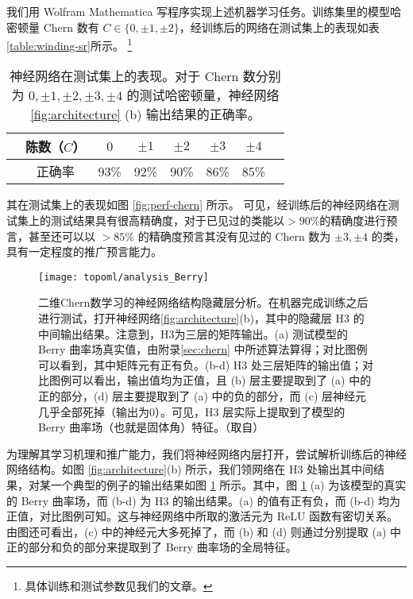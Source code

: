 我们用 Wolfram Mathematica 写程序实现上述机器学习任务。训练集里的模型哈密顿量 Chern 数有 $C\in\{0, \pm1, \pm2\}$，经训练后的网络在测试集上的表现如表\ref{table:winding-sr}所示。
\footnote{具体训练和测试参数见我们的文章。}

\begin{table}[t]
\centering
\caption{神经网络在测试集上的表现。对于 Chern 数分别为 $0, \pm1, \pm2, \pm3, \pm4$ 的测试哈密顿量，神经网络 \ref{fig:architecture} (b) 输出结果的正确率。}
\label{table:chern-sr}
\begin{tabular}{*{8}c}
\hline\hline
& 陈数（$C$） & $0$ & $\pm1$ & $\pm2$ & $\pm3$ & $\pm4$ & \\ \hline
& 正确率 & 93\% & 92\% & 90\% & 86\% & 85\% & \\
\hline\hline
\end{tabular}
\end{table}

其在测试集上的表现如图 \ref{fig:perf-chern} 所示。
可见，经训练后的神经网络在测试集上的测试结果具有很高精确度，对于已见过的类能以$>90\%$的精确度进行预言，甚至还可以以 $>85\%$ 的精确度预言其没有见过的 Chern 数为 $\pm3,\pm4$ 的类，具有一定程度的推广预言能力。


\begin{figure}[!htb]
\centering
\texttt{[image: topoml/analysis\_Berry]}
\caption{二维Chern数学习的神经网络结构隐藏层分析。在机器完成训练之后进行测试，打开神经网络\ref{fig:architecture}(b)，其中的隐藏层 H3 的中间输出结果。注意到，H3为三层的矩阵输出。(a) 测试模型的 Berry 曲率场真实值，由附录\ref{sec:chern} 中所述算法算得；对比图例可以看到，其中矩阵元有正有负。(b-d) H3 处三层矩阵的输出值；对比图例可以看出，输出值均为正值，且 (b) 层主要提取到了 (a) 中的正的部分，(d) 层主要提取到了 (a) 中的负的部分，而 (c) 层神经元几乎全部死掉（输出为0）。可见，H3 层实际上提取到了模型的 Berry 曲率场（也就是固体角）特征。（取自）}
\label{fig:anal-chern}
\end{figure}

为理解其学习机理和推广能力，我们将神经网络内层打开，尝试解析训练后的神经网络结构。如图 \ref{fig:architecture}(b) 所示，我们领网络在 H3 处输出其中间结果，对某一个典型的例子的输出结果如图 \ref{fig:anal-chern} 所示。其中，图 \ref{fig:anal-chern} (a) 为该模型的真实的 Berry 曲率场，而 (b-d) 为 H3 的输出结果。(a) 的值有正有负，而 (b-d) 均为正值，对比图例可知。这与神经网络中所取的激活元为 ReLU 函数有密切关系\cite{topoml}。由图还可看出，(c) 中的神经元大多死掉了，而 (b) 和 (d) 则通过分别提取 (a) 中正的部分和负的部分来提取到了 Berry 曲率场的全局特征。

